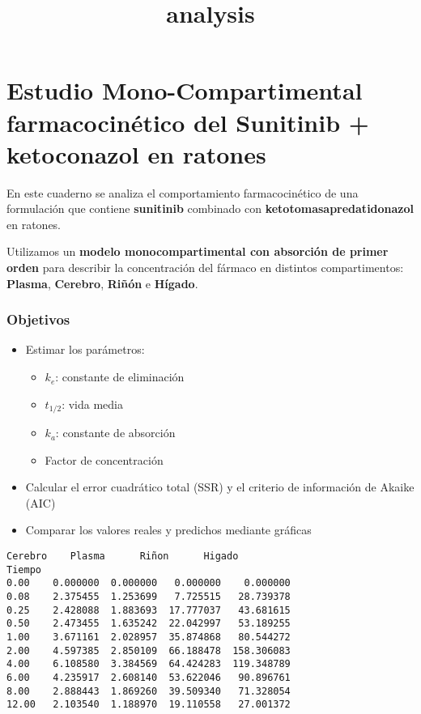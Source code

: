 \documentclass[11pt]{article}
\title{analysis}
\providecommand{\tightlist}{%
      \setlength{\itemsep}{0pt}\setlength{\parskip}{0pt}}
\begin{document}
    
    \maketitle
    
    

    
    \section{Estudio Mono-Compartimental farmacocinético del Sunitinib +
ketoconazol en ratones
🧪🐭}\label{estudio-mono-compartimental-farmacocinuxe9tico-del-sunitinib-ketoconazol-en-ratones}

En este cuaderno se analiza el comportamiento farmacocinético de una
formulación que contiene \textbf{sunitinib} combinado con
\textbf{ketotomasapredatidonazol} en ratones.

Utilizamos un \textbf{modelo monocompartimental con absorción de primer
orden} para describir la concentración del fármaco en distintos
compartimentos: \textbf{Plasma}, \textbf{Cerebro}, \textbf{Riñón} e
\textbf{Hígado}.

\subsubsection{Objetivos}\label{objetivos}

\begin{itemize}
\tightlist
\item
  Estimar los parámetros:

  \begin{itemize}
  \tightlist
  \item
    \(k_e\): constante de eliminación
  \item
    \(t_{1/2}\): vida media
  \item
    \(k_a\): constante de absorción
  \item
    Factor de concentración
  \end{itemize}
\item
  Calcular el error cuadrático total (SSR) y el criterio de información
  de Akaike (AIC)
\item
  Comparar los valores reales y predichos mediante gráficas
\end{itemize}

    \begin{Verbatim}[commandchars=\\\{\}]
         Cerebro    Plasma      Riñon      Higado
Tiempo
0.00    0.000000  0.000000   0.000000    0.000000
0.08    2.375455  1.253699   7.725515   28.739378
0.25    2.428088  1.883693  17.777037   43.681615
0.50    2.473455  1.635242  22.042997   53.189255
1.00    3.671161  2.028957  35.874868   80.544272
2.00    4.597385  2.850109  66.188478  158.306083
4.00    6.108580  3.384569  64.424283  119.348789
6.00    4.235917  2.608140  53.622046   90.896761
8.00    2.888443  1.869260  39.509340   71.328054
12.00   2.103540  1.188970  19.110558   27.001372
    \end{Verbatim}
\end{document}
